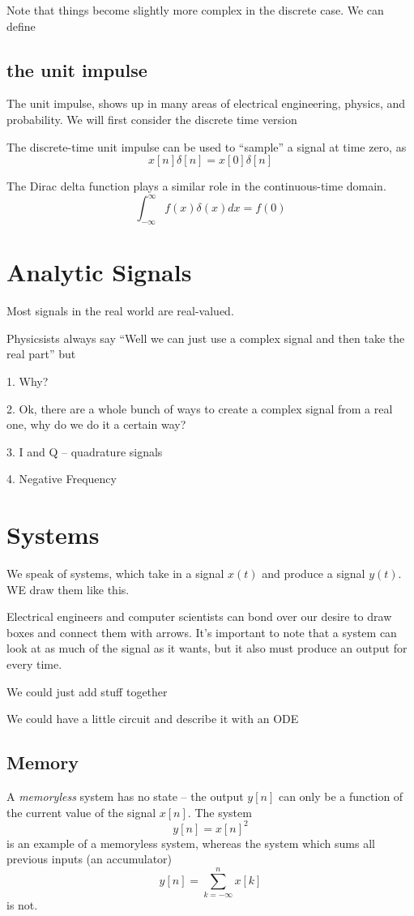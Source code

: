 Note that things become slightly more complex in the discrete case. We can
define

\subsection{the unit impulse}
The unit impulse, shows up in many areas of electrical
engineering, physics, and probability. We will first consider the 
discrete time version

The discrete-time unit impulse can be used to ``sample'' a signal
at time zero, as
\[
x[n]\delta[n] = x[0]\delta[n]
\]

The Dirac delta function plays a similar role in the continuous-time domain.
\[
\int_{-\infty}^\infty f(x) \delta(x) dx = f(0)
\]

\section{Analytic Signals}
Most signals in the real world are real-valued. 

Physicsists always say ``Well we can just use a complex signal and
then take the real part'' but

1. Why? 

2. Ok, there are a whole bunch of ways to create a complex signal from
a real one, why do we do it a certain way? 

3. I and Q -- quadrature signals

4. Negative Frequency

\section{Systems}

We speak of systems, which take in a signal $x(t)$ and produce a signal $y(t)$. WE
draw them like this. 

Electrical engineers and computer scientists can bond over our desire
to draw boxes and connect them with arrows. It's important to note that
a system can look at as much of the signal as it wants, but it also
must produce an output for every time. 

We could just add stuff together

We could have a little circuit and describe it with an ODE


\subsection{Memory}
A \textit{memoryless} system has no state -- the output $y[n]$ can only be a function
of the current value of the signal $x[n]$. The system 
\[
y[n] = x[n]^2
\]
is an example of a memoryless system, whereas the system which sums all previous
inputs (an accumulator) 
\[
y[n] = \sum_{k=-\infty}^n x[k]
\]
is not. 


